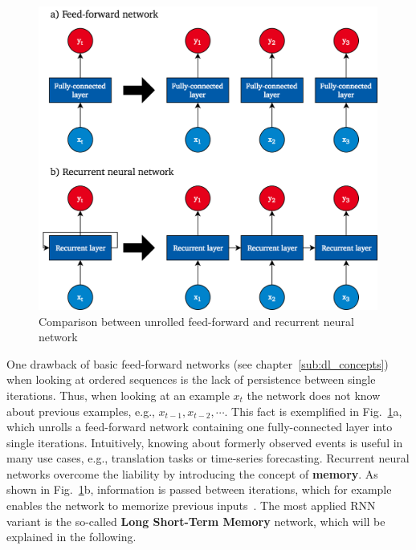 \begin{figure}[h]
  \centering
  \includegraphics[height=10cm]{img/rnn_unrolled_2}
  \caption{Comparison between unrolled feed-forward and recurrent neural network}
\label{fig:rnn_unrolled}
\end{figure}

One drawback of basic feed-forward networks (see chapter~\ref{sub:dl_concepts})
when looking at ordered sequences is the lack of persistence between single
iterations.
Thus, when looking at an example $x_t$ the network does not know about previous
examples, e.g., $x_{t-1}, x_{t-2},\cdots$.
This fact is exemplified in Fig.~\ref{fig:rnn_unrolled}a, which unrolls a
feed-forward network containing one fully-connected layer into single iterations.
Intuitively, knowing about formerly observed events is useful in many use cases,
e.g., translation tasks or time-series forecasting.
Recurrent neural networks overcome the liability by introducing the concept
of \textbf{memory}.
As shown in Fig.~\ref{fig:rnn_unrolled}b, information is passed between
iterations, which for example enables the network to memorize previous inputs~\cite{Goodfellow2016}.
The most applied RNN variant is the so-called \textbf{Long Short-Term Memory}
network, which will be explained in the following.

